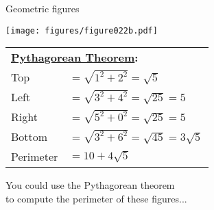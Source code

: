 \documentclass[14pt]{beamer}
\begin{document}
    \begin{frame}{Geometric figures}
        \begin{center}
            \begin{minipage}{0.5\textwidth}%
                \centering \texttt{[image: figures/figure022b.pdf]}
            \end{minipage}\hfill\begin{minipage}{0.49\textwidth} \footnotesize

                \hspace{-0.5em}\begin{tabular}{ll}
                    \multicolumn{2}{l}{\small \textbf{\href{https://en.wikipedia.org/wiki/Pythagorean_theorem}{Pythagorean Theorem}:}}           \\[4ex]
                    Top       & $\!\!\!\!\!= \sqrt{1^2 + 2^2} = \sqrt{5}$              \\[1.5ex]
                    Left      & $\!\!\!\!\!= \sqrt{3^2 + 4^2} = \sqrt{25} = 5$         \\[1.5ex]
                    Right     & $\!\!\!\!\!= \sqrt{5^2 + 0^2} = \sqrt{25} = 5$         \\[1.5ex]
                    Bottom    & $\!\!\!\!\!= \sqrt{3^2 + 6^2} = \sqrt{45} = 3\sqrt{5}$ \\[4ex]
                    Perimeter & $\!\!\!\!\!= 10 + 4\sqrt{5}$
                \end{tabular}
            \end{minipage}

            \bigskip \bigskip

            You could use the Pythagorean theorem\\to compute the perimeter of these figures...
        \end{center}
    \end{frame}

\end{document}
